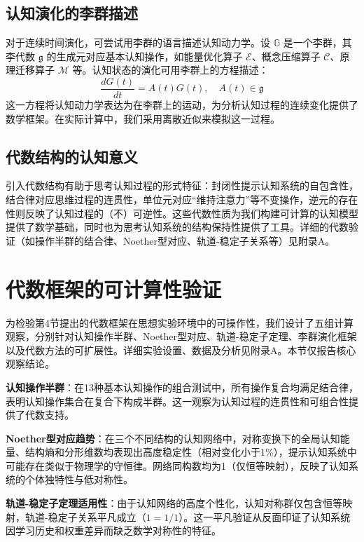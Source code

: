 \documentclass[12pt,a4paper]{article}
\newcommand{\cognitivegroup}{\mathbb{G}}
\newcommand{\energyoperator}{\mathcal{E}}
\newcommand{\compressionoperator}{\mathcal{C}}
\newcommand{\migrationoperator}{\mathcal{M}}
\begin{document}
\subsection{认知演化的李群描述}

对于连续时间演化，可尝试用李群的语言描述认知动力学。设 $\cognitivegroup$ 是一个李群，其李代数 $\mathfrak{g}$ 的生成元对应基本认知操作，如能量优化算子 $\energyoperator$、概念压缩算子 $\compressionoperator$、原理迁移算子 $\migrationoperator$ 等。认知状态的演化可用李群上的方程描述：
\begin{equation}
\frac{dG(t)}{dt} = A(t)G(t), \quad A(t) \in \mathfrak{g}
\end{equation}
这一方程将认知动力学表达为在李群上的运动，为分析认知过程的连续变化提供了数学框架。在实际计算中，我们采用离散近似来模拟这一过程。

\subsection{代数结构的认知意义}

引入代数结构有助于思考认知过程的形式特征：封闭性提示认知系统的自包含性，结合律对应思维过程的连贯性，单位元对应“维持注意力”等不变操作，逆元的存在性则反映了认知过程的（不）可逆性。这些代数性质为我们构建可计算的认知模型提供了数学基础，同时也为思考认知系统的结构保持性提供了工具。详细的代数验证（如操作半群的结合律、Noether型对应、轨道-稳定子关系等）见附录A。

\section{代数框架的可计算性验证}
\label{sec:algebraic_experiments}

为检验第4节提出的代数框架在思想实验环境中的可操作性，我们设计了五组计算观察，分别针对认知操作半群、Noether型对应、轨道-稳定子定理、李群演化框架以及代数方法的可扩展性。详细实验设置、数据及分析见附录A。本节仅报告核心观察结论。

\textbf{认知操作半群}：在13种基本认知操作的组合测试中，所有操作复合均满足结合律，表明认知操作集合在复合下构成半群。这一观察为认知过程的连贯性和可组合性提供了代数支持。

\textbf{Noether型对应趋势}：在三个不同结构的认知网络中，对称变换下的全局认知能量、结构熵和分形维数均表现出高度稳定性（相对变化小于1\%），提示认知系统中可能存在类似于物理学的守恒律。网络同构数均为1（仅恒等映射），反映了认知系统的个体独特性与低对称性。

\textbf{轨道-稳定子定理适用性}：由于认知网络的高度个性化，认知对称群仅包含恒等映射，轨道-稳定子关系平凡成立（$1 = 1/1$）。这一平凡验证从反面印证了认知系统因学习历史和权重差异而缺乏数学对称性的特征。
\end{document}
